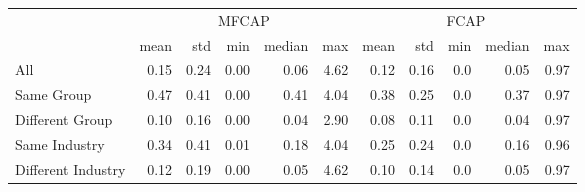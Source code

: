 \begin{tabular}{lrrrrrrrrrr}
\toprule
\multirow{2}{*}{}& \multicolumn{5}{c}{MFCAP} & \multicolumn{5}{c}{FCAP} \\
\cmidrule(lr){2-6} \cmidrule(lr){7-11}
&       mean &    std &    min & median &    max &         mean &    std &    min & median &    max \\
\midrule
All               &  0.15 &  0.24 &  0.00 &   0.06 &  4.62 &  0.12 &  0.16 &  0.0 &   0.05 &  0.97 \\
Same Group        &  0.47 &  0.41 &  0.00 &   0.41 &  4.04 &  0.38 &  0.25 &  0.0 &   0.37 &  0.97 \\
Different Group    &  0.10 &  0.16 &  0.00 &   0.04 &  2.90 &  0.08 &  0.11 &  0.0 &   0.04 &  0.97 \\
Same Industry     &  0.34 &  0.41 &  0.01 &   0.18 &  4.04 &  0.25 &  0.24 &  0.0 &   0.16 &  0.96 \\
Different Industry &  0.12 &  0.19 &  0.00 &   0.05 &  4.62 &  0.10 &  0.14 &  0.0 &   0.05 &  0.97 \\
\bottomrule
\end{tabular}
